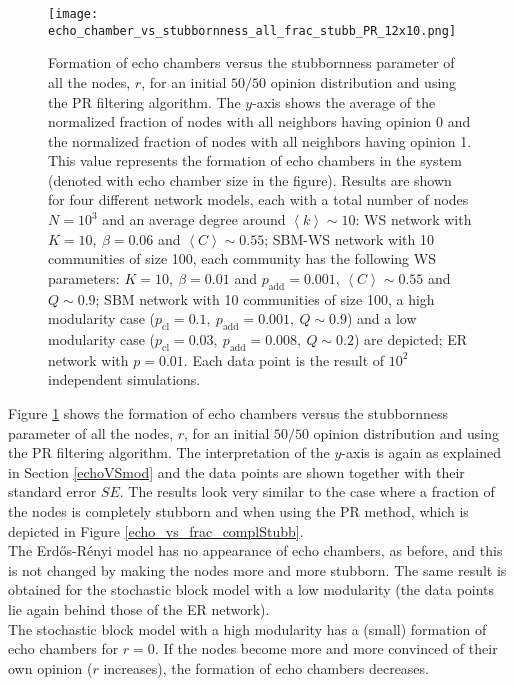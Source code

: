 \documentclass[11 pt , letterpaper , twoside , openright]{book}
\begin{document}
\begin{figure}[H]
	\texttt{[image: echo\_chamber\_vs\_stubbornness\_all\_frac\_stubb\_PR\_12x10.png]}
	\captionsetup{format=plain}
	\caption[Formation of echo chambers versus the stubbornness parameter of all the nodes, $r$, for the PR filtering algorithm and an initial $50/50$ opinion distribution.]{Formation of echo chambers versus the stubbornness parameter of all the nodes, $r$, for an initial $50/50$ opinion distribution and using the PR filtering algorithm. The $y$-axis shows the average of the normalized fraction of nodes with all neighbors having opinion 0 and the normalized fraction of nodes with all neighbors having opinion 1. This value represents the formation of echo chambers in the system (denoted with echo chamber size in the figure). Results are shown for four different network models, each with a total number of nodes $N=10^3$ and an average degree around $\left<k\right> \sim 10$: WS network with $K =10,\ \beta = 0.06$ and $\left<C\right> \sim 0.55$; SBM-WS network with 10 communities of size 100, each community has the following WS parameters: $K = 10,\ \beta = 0.01$ and $p_{\text{add}} = 0.001$, $\left<C\right> \sim 0.55$ and $Q \sim 0.9$; SBM network with 10 communities of size 100, a high modularity case ($p_{\text{cl}} = 0.1,\ p_{\text{add}} = 0.001,\ Q \sim 0.9$) and a low modularity case ($p_{\text{cl}} = 0.03,\ p_{\text{add}} = 0.008,\ Q \sim 0.2$) are depicted; ER network with $p= 0.01$. Each data point is the result of $10^2$ independent simulations.}
\label{echo_vs_all_frac_stubb_PR}
\end{figure}
\noindent
Figure \ref{echo_vs_all_frac_stubb_PR} shows the formation of echo chambers versus the stubbornness parameter of all the nodes, $r$, for an initial $50/50$ opinion distribution and using the PR filtering algorithm. The interpretation of the $y$-axis is again as explained in Section \ref{echoVSmod} and the data points are shown together with their standard error $SE$. The results look very similar to the case where a fraction of the nodes is completely stubborn and when using the PR method, which is depicted in Figure \ref{echo_vs_frac_complStubb}.\\
The Erd\H{o}s-R\'{e}nyi model has no appearance of echo chambers, as before, and this is not changed by making the nodes more and more stubborn. The same result is obtained for the stochastic block model with a low modularity (the data points lie again behind those of the ER network).\\
The stochastic block model with a high modularity has a (small) formation of echo chambers for $r=0$. If the nodes become more and more convinced of their own opinion ($r$ increases), the formation of echo chambers decreases.\\
\end{document}
